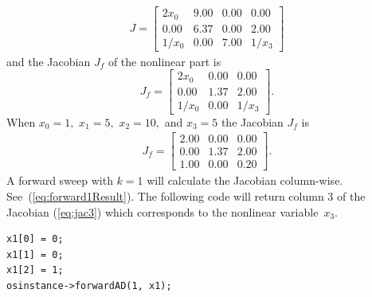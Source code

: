 \documentclass[11pt]{article}
\renewcommand{\_}{{\char"5F}}
\renewcommand{\{}{{\char"7B}}
\renewcommand{\}}{{\char"7D}}
\renewcommand{\^}{{\char"0D}}
\renewcommand{\'}{{\char"0D}}
\begin{document}
\begin{enumerate}[Step 1:]
\begin{eqnarray}
J =
\left[
\begin{array}{rrrr}
2x_{0} &9.00&0.00&0.00   \\
0.00&6.37&0.00&2.00 \\
1/x_{0}&0.00&7.00&1/x_{3}
\end{array}
\right] \label{eq:jac}
\end{eqnarray}
and the Jacobian $J_f$ of the nonlinear part is
%
\begin{equation}
    J_f = \left[
        \begin{array}{ccc}
            2x_0 & 0.00 & 0.00 \\
            0.00  & 1.37 & 2.00 \\
            1/x_0 & 0.00 & 1/x_3
        \end{array}
    \right].  \label{eq:jac2}
\end{equation}
When $x_{0} = 1,$ $x_{1} = 5,$ $x_{2} = 10,$ and $x_{3} = 5$ the Jacobian $J_f$ is
\begin{eqnarray}
    J_f = \left[
        \begin{array}{ccc}
            2.00 & 0.00 & 0.00 \\
            0.00 & 1.37 & 2.00 \\
            1.00 & 0.00 & 0.20
        \end{array}
    \right]. \label{eq:jac3}
\end{eqnarray}
A forward sweep with $k = 1$ will calculate the Jacobian column-wise.  See~(\ref{eq:forward1Result}).  
The following code will return column 3 of the Jacobian (\ref{eq:jac3}) which corresponds to the nonlinear variable~$x_{3}$.
\begin{verbatim}
x1[0] = 0;
x1[1] = 0;
x1[2] = 1;
osinstance->forwardAD(1, x1);
\end{verbatim}


\end{enumerate}
\end{document}
